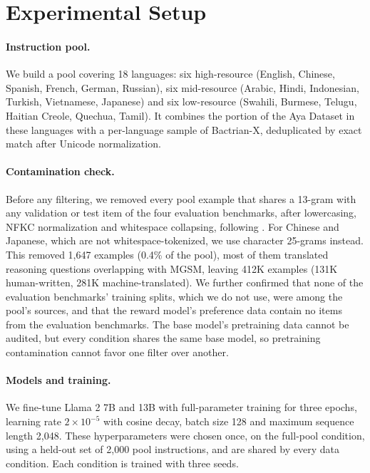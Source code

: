 \documentclass{article}
\begin{document}
\section{Experimental Setup}
\label{sec:setup}

\paragraph{Instruction pool.}
We build a pool covering 18 languages: six high-resource (English, Chinese, Spanish, French, German, Russian), six mid-resource (Arabic, Hindi, Indonesian, Turkish, Vietnamese, Japanese) and six low-resource (Swahili, Burmese, Telugu, Haitian Creole, Quechua, Tamil). It combines the portion of the Aya Dataset in these languages with a per-language sample of Bactrian-X, deduplicated by exact match after Unicode normalization.

\paragraph{Contamination check.}
Before any filtering, we removed every pool example that shares a 13-gram with any validation or test item of the four evaluation benchmarks, after lowercasing, NFKC normalization and whitespace collapsing, following \citet{brown2020gpt3}. For Chinese and Japanese, which are not whitespace-tokenized, we use character 25-grams instead. This removed 1,647 examples (0.4\% of the pool), most of them translated reasoning questions overlapping with MGSM, leaving 412K examples (131K human-written, 281K machine-translated). We further confirmed that none of the evaluation benchmarks' training splits, which we do not use, were among the pool's sources, and that the reward model's preference data contain no items from the evaluation benchmarks. The base model's pretraining data cannot be audited, but every condition shares the same base model, so pretraining contamination cannot favor one filter over another.

\paragraph{Models and training.}
We fine-tune Llama 2 7B and 13B \citep{touvron2023llama2} with full-parameter training for three epochs, learning rate $2 \times 10^{-5}$ with cosine decay, batch size 128 and maximum sequence length 2,048. These hyperparameters were chosen once, on the full-pool condition, using a held-out set of 2,000 pool instructions, and are shared by every data condition. Each condition is trained with three seeds.
\end{document}
